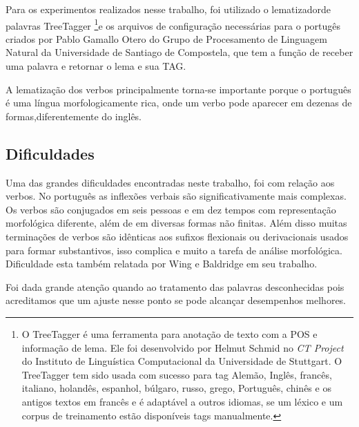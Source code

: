 Para os experimentos realizados nesse trabalho, foi utilizado o lematizadorde palavras TreeTagger \footnote{O TreeTagger é uma ferramenta para anotação de texto com a POS e informação de lema. Ele foi desenvolvido por Helmut Schmid no \emph{CT Project} do Instituto de Linguística Computacional da Universidade de Stuttgart. O TreeTagger tem sido usada com sucesso para tag Alemão, Inglês, francês, italiano, holandês, espanhol, búlgaro, russo, grego, Português, chinês e os antigos textos em francês e é adaptável a outros idiomas, se um léxico e um corpus de treinamento estão disponíveis tags manualmente.}e os arquivos de configuração necessárias para o portugês criados por Pablo Gamallo Otero do Grupo de Procesamento de Linguagem Natural da Universidade de Santiago de Compostela, que tem a função de receber uma palavra e retornar o lema e sua TAG.

A lematização dos verbos principalmente torna-se importante porque o português é uma língua morfologicamente rica, onde um verbo pode aparecer em dezenas de formas,diferentemente do inglês.


\subsection{Dificuldades}
\label{sec:dificuldades}

Uma das grandes dificuldades encontradas neste trabalho, foi com relação aos verbos. No português as inflexões verbais são significativamente mais complexas. Os verbos são conjugados em seis pessoas e em dez tempos com representação morfológica diferente, além de em diversas formas não finitas. Além disso muitas terminações de verbos são idênticas aos sufixos flexionais ou derivacionais usados para formar substantivos, isso complica e muito a tarefa de análise morfológica. Dificuldade esta também relatada por Wing e Baldridge em seu trabalho.

Foi dada grande atenção quando ao tratamento das palavras desconhecidas pois acreditamos que um ajuste nesse ponto se pode alcançar desempenhos melhores.



